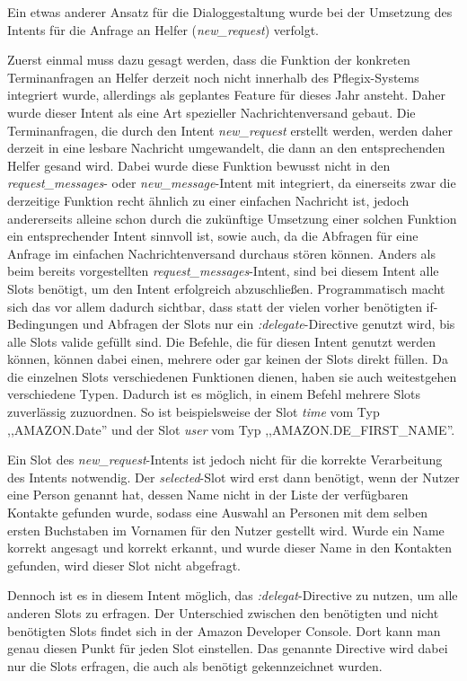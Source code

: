 Ein etwas anderer Ansatz für die Dialoggestaltung wurde bei der Umsetzung des Intents für die Anfrage an Helfer (\textit{new\_request}) verfolgt.

Zuerst einmal muss dazu gesagt werden, dass die Funktion der konkreten Terminanfragen an Helfer derzeit noch nicht innerhalb des Pflegix-Systems integriert wurde, allerdings als geplantes Feature für dieses Jahr ansteht. Daher wurde dieser Intent als eine Art spezieller Nachrichtenversand gebaut. Die Terminanfragen, die durch den Intent \textit{new\_request} erstellt werden, werden daher derzeit in eine lesbare Nachricht umgewandelt, die dann an den entsprechenden Helfer gesand wird. Dabei wurde diese Funktion bewusst nicht in den \textit{request\_messages}- oder \textit{new\_message}-Intent mit integriert, da einerseits zwar die derzeitige Funktion recht ähnlich zu einer einfachen Nachricht ist, jedoch andererseits alleine schon durch die zukünftige Umsetzung einer solchen Funktion ein entsprechender Intent sinnvoll ist, sowie auch, da die Abfragen für eine Anfrage im einfachen Nachrichtenversand durchaus stören können.
Anders als beim bereits vorgestellten \textit{request\_messages}-Intent, sind bei diesem Intent alle Slots benötigt, um den Intent erfolgreich abzuschließen. Programmatisch macht sich das vor allem dadurch sichtbar, dass statt der vielen vorher benötigten if-Bedingungen und Abfragen der Slots nur ein \textit{:delegate}-Directive genutzt wird, bis alle Slots valide gefüllt sind.
Die Befehle, die für diesen Intent genutzt werden können, können dabei einen, mehrere oder gar keinen der Slots direkt füllen. Da die einzelnen Slots verschiedenen Funktionen dienen, haben sie auch weitestgehen verschiedene Typen. Dadurch ist es möglich, in einem Befehl mehrere Slots zuverlässig zuzuordnen. So ist beispielsweise der Slot \textit{time} vom Typ ,,AMAZON.Date'' und der Slot \textit{user} vom Typ ,,AMAZON.DE\_FIRST\_NAME''.

Ein Slot des \textit{new\_request}-Intents ist jedoch nicht für die korrekte Verarbeitung des Intents notwendig. Der \textit{selected}-Slot wird erst dann benötigt, wenn der Nutzer eine Person genannt hat, dessen Name nicht in der Liste der verfügbaren Kontakte gefunden wurde, sodass eine Auswahl an Personen mit dem selben ersten Buchstaben im Vornamen für den Nutzer gestellt wird. Wurde ein Name korrekt angesagt und korrekt erkannt, und wurde dieser Name in den Kontakten gefunden, wird dieser Slot nicht abgefragt.

Dennoch ist es in diesem Intent möglich, das \textit{:delegat}-Directive zu nutzen, um alle anderen Slots zu erfragen. Der Unterschied zwischen den benötigten und nicht benötigten Slots findet sich in der Amazon Developer Console. Dort kann man genau diesen Punkt für jeden Slot einstellen. Das genannte Directive wird dabei nur die Slots erfragen, die auch als benötigt gekennzeichnet wurden.

